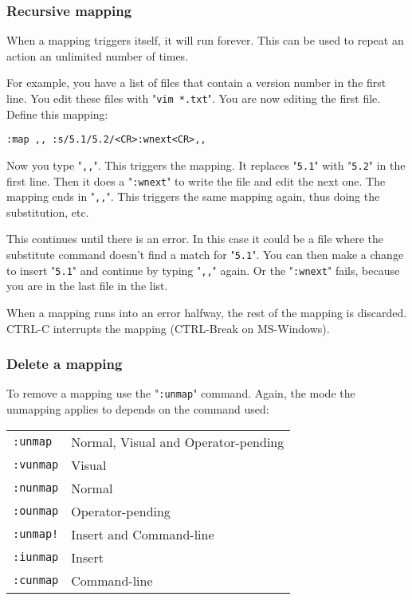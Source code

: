 \subsubsection{Recursive mapping}
When a mapping triggers itself, it will run forever.
This can be used to repeat an action an unlimited number of times.

For example, you have a list of files that contain a version number in the first line.
You edit these files with "\texttt{vim *.txt}".
You are now editing the first file.
Define this mapping:

\begin{Verbatim}[samepage=true]
 :map ,, :s/5.1/5.2/<CR>:wnext<CR>,,
\end{Verbatim}

Now you type "\texttt{,,}".
This triggers the mapping.
It replaces "\texttt{5.1}" with "\texttt{5.2}" in the first line.
Then it does a "\texttt{:wnext}" to write the file and edit the next one.
The mapping ends in "\texttt{,,}".
This triggers the same mapping again, thus doing the substitution, etc.

This continues until there is an error.
In this case it could be a file where the substitute command doesn't find a match for "\texttt{5.1}".
You can then make a change to insert "\texttt{5.1}" and continue by typing "\texttt{,,}" again.
Or the "\texttt{:wnext}" fails, because you are in the last file in the list.

When a mapping runs into an error halfway, the rest of the mapping is discarded.
CTRL-C interrupts the mapping (CTRL-Break on MS-Windows).
\subsubsection{Delete a mapping}
To remove a mapping use the "\texttt{:unmap}" command.
Again, the mode the unmapping applies to depends on the command used:

\begin{center} \begin{tabular}{l l}
				\texttt{:unmap} & Normal, Visual and Operator-pending \\
				\texttt{:vunmap} & Visual \\
				\texttt{:nunmap} & Normal \\
				\texttt{:ounmap} & Operator-pending \\
				\texttt{:unmap!} & Insert and Command-line \\
				\texttt{:iunmap} & Insert \\
				\texttt{:cunmap} & Command-line \\
\end{tabular} \end{center}

